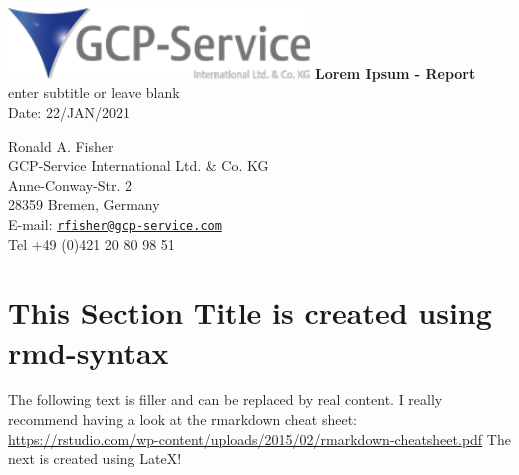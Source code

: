 \documentclass[oneside, 12pt, a4paper]{article}
\begin{document}
\begin{titlepage}
   \begin{center}
    \includegraphics[width=0.6\textwidth]{gpc-service-logo.png}
       \vspace*{1cm}
        \vfill
        \huge
        \textbf{Lorem Ipsum - Report} \\
        \large
        \vspace{0.5cm}
        enter subtitle or leave blank\\
        \vspace{0.5cm}
        Date: 22/JAN/2021\\
        \vspace{1.5cm}
        \vfill
        \vspace{0.8cm}

\begin{flushleft}
Ronald A. Fisher\\
GCP-Service International Ltd. \& Co. KG \\
Anne-Conway-Str. 2 \\
28359 Bremen, Germany \\
E-mail: \href{mailto:rfisher@gcp-service.com}{\nolinkurl{rfisher@gcp-service.com}}\\
Tel +49 (0)421 20 80 98 51
\end{flushleft}
\end{center}

\end{titlepage}

\tableofcontents
\newpage
\listoffigures
\newpage
\listoftables
\newpage

\hypertarget{this-section-title-is-created-using-rmd-syntax}{%
\section{This Section Title is created using
rmd-syntax}\label{this-section-title-is-created-using-rmd-syntax}}

The following text is filler and can be replaced by real content. I
really recommend having a look at the rmarkdown cheat sheet:
\url{https://rstudio.com/wp-content/uploads/2015/02/rmarkdown-cheatsheet.pdf}
The next is created using LateX!
\end{document}
